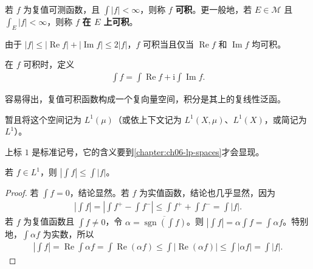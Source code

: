\documentclass[../../main.tex]{subfiles}%
\begin{document}
\begin{definition}[复值可积函数]\label{definition:ch02-complex-integrable}
若 $f$ 为复值可测函数，且 $\int|f|<\infty$，则称 $f$ \textbf{可积}。更一般地，若 $E\in\mathscr{M}$ 且 $\int_E|f|<\infty$，则称 $f$ \textbf{在 $E$ 上可积}。
\end{definition}
\begin{remark}
由于 $|f|\le|\operatorname{Re}f|+|\operatorname{Im}f|\le2|f|$，$f$ 可积当且仅当 $\operatorname{Re}f$ 和 $\operatorname{Im}f$ 均可积。
\end{remark}
\begin{definition}[复值函数的积分]\label{definition:ch02-complex-integral}
在 $f$ 可积时，定义
\begin{align*}
\int f=\int\operatorname{Re}f+\mathrm{i}\int\operatorname{Im}f.
\end{align*}
\end{definition}
\begin{proposition}\label{proposition:ch02-complex-integral-linearity}
容易得出，复值可积函数构成一个复向量空间，积分是其上的复线性泛函。
\end{proposition}
\begin{definition}[$L^1$ 的暂定记号]\label{definition:ch02-lone-provisional}
暂且将这个空间记为 $L^1(\mu)$（或依上下文记为 $L^1(X,\mu)$、$L^1(X)$，或简记为 $L^1$）。
\end{definition}
上标 $1$ 是标准记号，它的含义要到\cref{chapter:ch06-lp-spaces}才会显现。
\begin{proposition}\label{proposition:ch02-integral-triangle}
若 $f\in L^1$，则 $\left|\int f\right|\le\int|f|$。
\end{proposition}
\begin{proof}
若 $\int f=0$，结论显然。若 $f$ 为实值函数，结论也几乎显然，因为
\begin{align*}
\left|\int f\right|=\left|\int f^+-\int f^-\right|\le\int f^++\int f^-=\int|f|.
\end{align*}
若 $f$ 为复值函数且 $\int f\ne0$，令 $\alpha=\overline{\operatorname{sgn}(\int f)}$。则 $|\int f|=\alpha\int f=\int\alpha f$。特别地，$\int\alpha f$ 为实数，所以
\begin{align*}
\left|\int f\right|=\operatorname{Re}\int\alpha f=\int\operatorname{Re}(\alpha f)
\le\int|\operatorname{Re}(\alpha f)|\le\int|\alpha f|=\int|f|.
\end{align*}
\end{proof}
\end{document}
